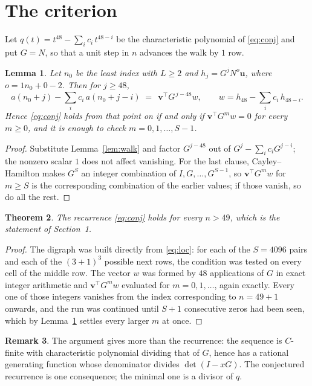\documentclass[11pt,a4paper]{article}
\theoremstyle{plain}
\newtheorem{theorem}{Theorem}
\newtheorem{lemma}[theorem]{Lemma}
\theoremstyle{definition}
\newtheorem{remark}[theorem]{Remark}
\begin{document}
\section{The criterion}

Let $q(t)=t^{48}-\sum_i c_i\,t^{48-i}$ be the characteristic polynomial of
\eqref{eq:conj} and put $G=N$, so that a unit step in $n$ advances the walk by
$1$ row.

\begin{lemma}\label{lem:crit}
Let $n_0$ be the least index with $L\ge2$ and $h_j=G^{j}N^{o}\mathbf{u}$, where
$o=1n_0+0-2$. Then for $j\ge48$,
\[
a(n_0+j)-\sum_i c_i\,a(n_0+j-i)\;=\;\,\mathbf{v}^{\!\top}G^{\,j-48}w,
\qquad w=h_{48}-\sum_i c_i\,h_{48-i} .
\]
Hence \eqref{eq:conj} holds from that point on if and only if
$\mathbf{v}^{\!\top}G^{m}w=0$ for every $m\ge0$, and it is enough to check
$m=0,1,\dots,S-1$.
\end{lemma}

\begin{proof}
Substitute Lemma~\ref{lem:walk} and factor $G^{j-48}$ out of
$G^{j}-\sum_ic_iG^{j-i}$; the nonzero scalar $1$ does not affect
vanishing. For the last clause, Cayley--Hamilton makes $G^{S}$ an integer combination of
$I,G,\dots,G^{S-1}$, so $\mathbf{v}^{\!\top}G^{m}w$ for $m\ge S$ is the corresponding
combination of the earlier values; if those vanish, so do all the rest.
\end{proof}

\begin{theorem}
The recurrence \eqref{eq:conj} holds for every $n>49$, which is the statement of
Section~1.
\end{theorem}

\begin{proof}
The digraph was built directly from \eqref{eq:loc}: for each of the $S=4096$ pairs and each
of the $(3+1)^{3}$ possible next rows, the condition was tested on every cell of
the middle row. The vector $w$ was formed by $48$ applications of $G$ in exact integer
arithmetic and $\mathbf{v}^{\!\top}G^{m}w$ evaluated for $m=0,1,\dots$, again exactly.
Every one of those integers vanishes from the index corresponding to $n=49+1$ onwards,
and the run was continued until $S+1$ consecutive zeros had been seen, which by
Lemma~\ref{lem:crit} settles every larger $m$ at once.
\end{proof}

\begin{remark}
The argument gives more than the recurrence: the sequence is $C$-finite with characteristic
polynomial dividing that of $G$, hence has a rational generating function whose denominator
divides $\det(I-xG)$. The conjectured recurrence is one consequence; the minimal one is a
divisor of $q$.
\end{remark}
\end{document}
